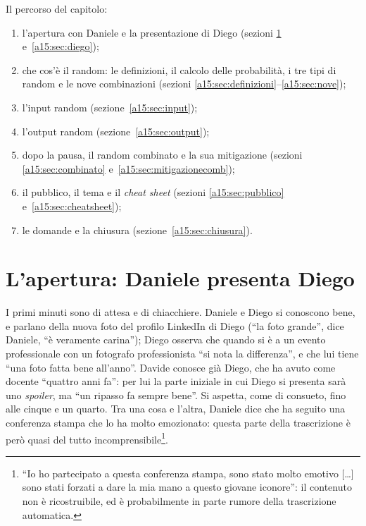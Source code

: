 Il percorso del capitolo:
\begin{enumerate}
  \item l'apertura con Daniele e la presentazione di Diego (sezioni
        \ref{a15:sec:apertura} e~\ref{a15:sec:diego});
  \item che cos'è il random: le definizioni, il calcolo delle probabilità, i tre tipi
        di random e le nove combinazioni (sezioni
        \ref{a15:sec:definizioni}--\ref{a15:sec:nove});
  \item l'input random (sezione~\ref{a15:sec:input});
  \item l'output random (sezione~\ref{a15:sec:output});
  \item dopo la pausa, il random combinato e la sua mitigazione (sezioni
        \ref{a15:sec:combinato} e~\ref{a15:sec:mitigazionecomb});
  \item il pubblico, il tema e il \emph{cheat sheet} (sezioni \ref{a15:sec:pubblico}
        e~\ref{a15:sec:cheatsheet});
  \item le domande e la chiusura (sezione~\ref{a15:sec:chiusura}).
\end{enumerate}

\section{L'apertura: Daniele presenta Diego}
\label{a15:sec:apertura}

I primi minuti sono di attesa e di chiacchiere. Daniele e Diego si conoscono bene, e
parlano della nuova foto del profilo LinkedIn di Diego (``la foto grande'', dice Daniele,
``è veramente carina''); Diego osserva che quando si è a un evento professionale con un
fotografo professionista ``si nota la differenza'', e che lui tiene ``una foto fatta bene
all'anno''. Davide conosce già Diego, che ha avuto come docente ``quattro anni fa'': per lui
la parte iniziale in cui Diego si presenta sarà uno \emph{spoiler}, ma ``un ripasso fa
sempre bene''. Si aspetta, come di consueto, fino alle cinque e un quarto. Tra una cosa e
l'altra, Daniele dice che ha seguito una conferenza stampa che lo ha molto emozionato:
questa parte della trascrizione è però quasi del tutto incomprensibile\footnote{``Io ho
partecipato a questa conferenza stampa, sono stato molto emotivo [\ldots] sono stati forzati
a dare la mia mano a questo giovane iconore'': il contenuto non è ricostruibile, ed è
probabilmente in parte rumore della trascrizione automatica.}.


